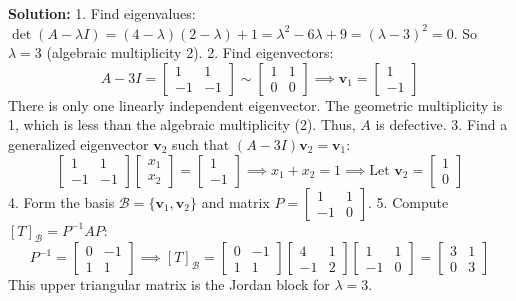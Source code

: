 \documentclass[11pt, a4paper]{article}
\theoremstyle{definition}
\theoremstyle{remark}
\begin{document}
\textbf{Solution:}
1. Find eigenvalues: $\det(A - \lambda I) = (4-\lambda)(2-\lambda) + 1 = \lambda^2 - 6\lambda + 9 = (\lambda - 3)^2 = 0$. So $\lambda = 3$ (algebraic multiplicity 2).
2. Find eigenvectors: 
\[
A - 3I = \begin{bmatrix} 1 & 1 \\ -1 & -1 \end{bmatrix} \sim \begin{bmatrix} 1 & 1 \\ 0 & 0 \end{bmatrix} \implies \mathbf{v}_1 = \begin{bmatrix} 1 \\ -1 \end{bmatrix}
\]
There is only one linearly independent eigenvector. The geometric multiplicity is 1, which is less than the algebraic multiplicity (2). Thus, $A$ is defective.
3. Find a generalized eigenvector $\mathbf{v}_2$ such that $(A - 3I)\mathbf{v}_2 = \mathbf{v}_1$:
\[
\begin{bmatrix} 1 & 1 \\ -1 & -1 \end{bmatrix} \begin{bmatrix} x_1 \\ x_2 \end{bmatrix} = \begin{bmatrix} 1 \\ -1 \end{bmatrix} \implies x_1 + x_2 = 1 \implies \text{Let } \mathbf{v}_2 = \begin{bmatrix} 1 \\ 0 \end{bmatrix}
\]
4. Form the basis $\mathcal{B} = \{\mathbf{v}_1, \mathbf{v}_2\}$ and matrix $P = \begin{bmatrix} 1 & 1 \\ -1 & 0 \end{bmatrix}$.
5. Compute $[T]_\mathcal{B} = P^{-1}AP$:
\[
P^{-1} = \begin{bmatrix} 0 & -1 \\ 1 & 1 \end{bmatrix} \implies [T]_\mathcal{B} = \begin{bmatrix} 0 & -1 \\ 1 & 1 \end{bmatrix} \begin{bmatrix} 4 & 1 \\ -1 & 2 \end{bmatrix} \begin{bmatrix} 1 & 1 \\ -1 & 0 \end{bmatrix} = \begin{bmatrix} 3 & 1 \\ 0 & 3 \end{bmatrix}
\]
This upper triangular matrix is the Jordan block for $\lambda = 3$.
\end{document}
